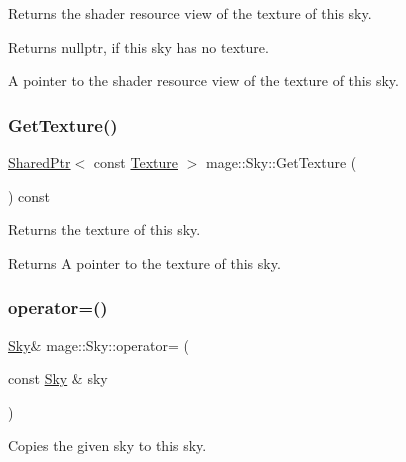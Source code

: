 Returns the shader resource view of the texture of this sky.

\begin{DoxyReturn}{Returns}
{\ttfamily nullptr}, if this sky has no texture. 

A pointer to the shader resource view of the texture of this sky. 
\end{DoxyReturn}
\hypertarget{structmage_1_1_sky_abd49f247b3a376475471310d6396386b}{}\label{structmage_1_1_sky_abd49f247b3a376475471310d6396386b} 
\subsubsection{\texorpdfstring{Get\+Texture()}{GetTexture()}}
{\footnotesize\ttfamily \hyperlink{namespacemage_a1e01ae66713838a7a67d30e44c67703e}{Shared\+Ptr}$<$ const \hyperlink{classmage_1_1_texture}{Texture} $>$ mage\+::\+Sky\+::\+Get\+Texture (\begin{DoxyParamCaption}{ }\end{DoxyParamCaption}) const\hspace{0.3cm}{\ttfamily [noexcept]}}

Returns the texture of this sky.

\begin{DoxyReturn}{Returns}
A pointer to the texture of this sky. 
\end{DoxyReturn}
\hypertarget{structmage_1_1_sky_a1ed7e2e383a87025347ee63b25f0f544}{}\label{structmage_1_1_sky_a1ed7e2e383a87025347ee63b25f0f544} 
\subsubsection{\texorpdfstring{operator=()}{operator=()}\hspace{0.1cm}{\footnotesize\ttfamily [1/2]}}
{\footnotesize\ttfamily \hyperlink{structmage_1_1_sky}{Sky}\& mage\+::\+Sky\+::operator= (\begin{DoxyParamCaption}\item[{const \hyperlink{structmage_1_1_sky}{Sky} \&}]{sky }\end{DoxyParamCaption})\hspace{0.3cm}{\ttfamily [delete]}}

Copies the given sky to this sky.


